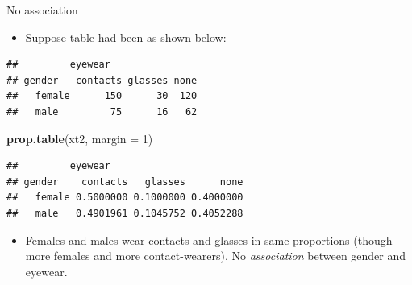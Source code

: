 \documentclass[ignorenonframetext,]{beamer}
\newenvironment{Shaded}{\begin{snugshade}}{\end{snugshade}}
\newcommand{\DataTypeTok}[1]{\textcolor[rgb]{0.13,0.29,0.53}{#1}}
\newcommand{\DecValTok}[1]{\textcolor[rgb]{0.00,0.00,0.81}{#1}}
\newcommand{\KeywordTok}[1]{\textcolor[rgb]{0.13,0.29,0.53}{\textbf{#1}}}
\newcommand{\NormalTok}[1]{#1}
\newcommand{\OperatorTok}[1]{\textcolor[rgb]{0.81,0.36,0.00}{\textbf{#1}}}
\newcommand{\StringTok}[1]{\textcolor[rgb]{0.31,0.60,0.02}{#1}}
\providecommand{\tightlist}{%
  \setlength{\itemsep}{0pt}\setlength{\parskip}{0pt}}
\begin{document}
\begin{frame}[fragile]{No association}
\protect\hypertarget{no-association}{}

\begin{itemize}
\tightlist
\item
  Suppose table had been as shown below:
\end{itemize}

\begin{Shaded}
\end{Shaded}

\begin{verbatim}
##         eyewear
## gender   contacts glasses none
##   female      150      30  120
##   male         75      16   62
\end{verbatim}

\begin{Shaded}
\begin{Highlighting}[]
\KeywordTok{prop.table}\NormalTok{(xt2, }\DataTypeTok{margin =} \DecValTok{1}\NormalTok{)}
\end{Highlighting}
\end{Shaded}

\begin{verbatim}
##         eyewear
## gender    contacts   glasses      none
##   female 0.5000000 0.1000000 0.4000000
##   male   0.4901961 0.1045752 0.4052288
\end{verbatim}

\begin{itemize}
\tightlist
\item
  Females and males wear contacts and glasses in same proportions
  (though more females and more contact-wearers). No \emph{association}
  between gender and eyewear.
\end{itemize}

\end{frame}
\end{document}
